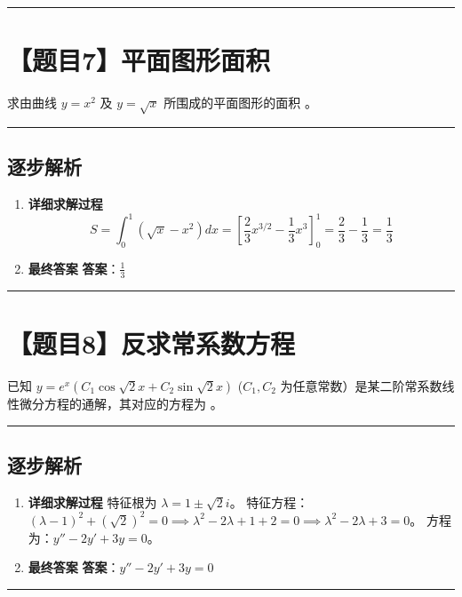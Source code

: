 \documentclass[UTF8]{ctexart}
\newenvironment{redenv}{\color{red}}{}
\newenvironment{detailedanalysis}{%
    \color{red}
    \begin{enumerate}[label=\textbf{第\arabic*步：}, leftmargin=*, align=left, itemsep=1.5ex]
}{%
    \end{enumerate}
}
\newcommand{\problemrule}{\noindent\rule{\textwidth}{1.5pt}\vspace{-0.8em}}
\newcommand{\analysisrule}{\noindent\rule{\textwidth}{0.8pt}\vspace{-0.8em}}
\newcommand{\blank}[1]{\underline{\hspace{#1}}}
\begin{document}
\problemrule
\section*{【题目7】平面图形面积}
求由曲线 $ y = x^{2} $ 及 $ y = \sqrt{x} $ 所围成的平面图形的面积 \blank{2cm}。

\begin{redenv}
\analysisrule
\subsection*{逐步解析}

\begin{detailedanalysis}
\item \textbf{详细求解过程}
$$ S = \int_0^1 (\sqrt{x} - x^2) dx = [\frac{2}{3}x^{3/2} - \frac{1}{3}x^3]_0^1 = \frac{2}{3} - \frac{1}{3} = \frac{1}{3} $$

\item \textbf{最终答案}
\textbf{答案}：$ \frac{1}{3} $
\end{detailedanalysis}
\end{redenv}

\problemrule
\section*{【题目8】反求常系数方程}
已知 $ y = e^{x}(C_{1} \cos \sqrt{2} x + C_{2} \sin \sqrt{2} x) $ ($C_{1}, C_{2}$ 为任意常数）是某二阶常系数线性微分方程的通解，其对应的方程为 \blank{2cm}。

\begin{redenv}
\analysisrule
\subsection*{逐步解析}

\begin{detailedanalysis}
\item \textbf{详细求解过程}
特征根为 $\lambda = 1 \pm \sqrt{2}i$。
特征方程：$(\lambda - 1)^2 + (\sqrt{2})^2 = 0 \implies \lambda^2 - 2\lambda + 1 + 2 = 0 \implies \lambda^2 - 2\lambda + 3 = 0$。
方程为：$y'' - 2y' + 3y = 0$。

\item \textbf{最终答案}
\textbf{答案}：$ y'' - 2y' + 3y = 0 $
\end{detailedanalysis}
\end{redenv}

\problemrule
\end{document}
